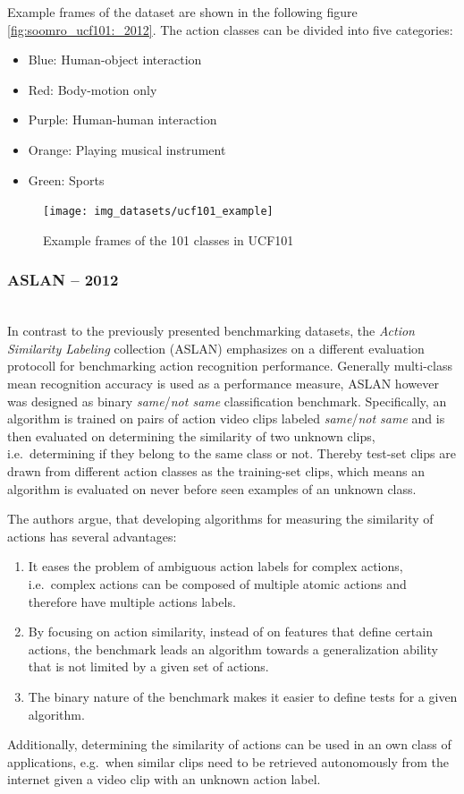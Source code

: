 Example frames of the dataset are shown in the following figure \ref{fig:soomro_ucf101:_2012}.
The action classes can be divided into five categories: \cite{soomro_ucf101:_2012}
\begin{itemize}
    \item Blue: Human-object interaction
    \item Red: Body-motion only
    \item Purple: Human-human interaction
    \item Orange: Playing musical instrument
    \item Green: Sports
\end{itemize}

\begin{figure}[H]
    \centering
    \texttt{[image: img\_datasets/ucf101\_example]}
    \caption{Example frames of the 101 classes in UCF101 \cite{soomro_ucf101:_2012}}
    \label{fig:ucf101_example}
\end{figure}


\subsubsection{ASLAN -- 2012}
\cite{kliper-gross_action_2012} \\
In contrast to the previously presented benchmarking datasets, the \textit{Action Similarity Labeling} collection (ASLAN) \cite{kliper-gross_action_2012} emphasizes on a different evaluation protocoll for benchmarking action recognition performance.
Generally multi-class mean recognition accuracy is used as a performance measure, ASLAN however was designed as binary \textit{same}/\textit{not same} classification benchmark.
Specifically, an algorithm is trained on pairs of action video clips labeled \textit{same}/\textit{not same} and is then evaluated on determining the similarity of two unknown clips, i.e.\ determining if they belong to the same class or not.
Thereby test-set clips are drawn from different action classes as the training-set clips, which means an algorithm is evaluated on never before seen examples of an unknown class.

The authors \textcite{kliper-gross_action_2012} argue, that developing algorithms for measuring the similarity of actions has several advantages:
\begin{enumerate}
    \item It eases the problem of ambiguous action labels for complex actions, i.e.\ complex actions can be composed of multiple atomic actions and therefore have multiple actions labels.
    \item By focusing on action similarity, instead of on features that define certain actions, the benchmark leads an algorithm towards a generalization ability that is not limited by a given set of actions.
    \item The binary nature of the benchmark makes it easier to define tests for a given algorithm.
\end{enumerate}
Additionally, determining the similarity of actions can be used in an own class of applications, e.g.\ when similar clips need to be retrieved autonomously from the internet given a video clip with an unknown action label.

